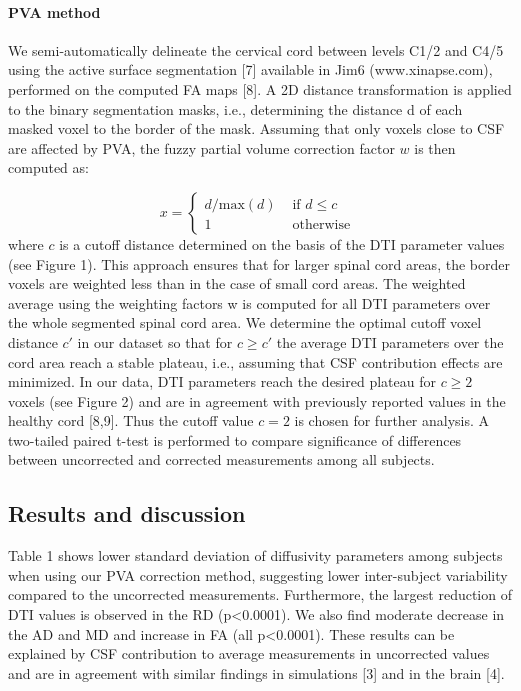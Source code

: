 \paragraph{PVA method} We semi-automatically delineate the cervical cord between levels C1/2 and C4/5 using the active surface segmentation [7] available in Jim6 (www.xinapse.com), performed on the computed FA maps [8]. A 2D distance transformation is applied to the binary segmentation masks, i.e., determining the distance d of each masked voxel to the border of the mask. Assuming that only voxels close to CSF are affected by PVA, the fuzzy partial volume correction factor $w$ is then computed as: 

$$ x =\left\{
\begin{array}{lll}
	d/\mbox{max}(d)&\mbox{ if } d\leq c\\
	1&\mbox{ otherwise } 
\end{array}
\right. $$ where $c$ is a cutoff distance determined on the basis of the DTI parameter values (see Figure 1). This approach ensures that for larger spinal cord areas, the border voxels are weighted less than in the case of small cord areas. The weighted average using the weighting factors w is computed for all DTI parameters over the whole segmented spinal cord area. We determine the optimal cutoff voxel distance $c'$ in our dataset so that for $c\geq c'$ the average DTI parameters over the cord area reach a stable plateau, i.e., assuming that CSF contribution effects are minimized. In our data, DTI parameters reach the desired plateau for $c\geq 2$ voxels (see Figure 2) and are in agreement with previously reported values in the healthy cord [8,9]. Thus the cutoff value $c=2$ is chosen for further analysis. A two-tailed paired t-test is performed to compare significance of differences between uncorrected and corrected measurements among all subjects. 
\subsection*{Results and discussion} Table 1 shows lower standard deviation of diffusivity parameters among subjects when using our PVA correction method, suggesting lower inter-subject variability compared to the uncorrected measurements. Furthermore, the largest reduction of DTI values is observed in the RD (p<0.0001). We also find moderate decrease in the AD and MD and increase in FA (all p<0.0001). These results can be explained by CSF contribution to average measurements in uncorrected values and are in agreement with similar findings in simulations [3] and in the brain [4]. 
